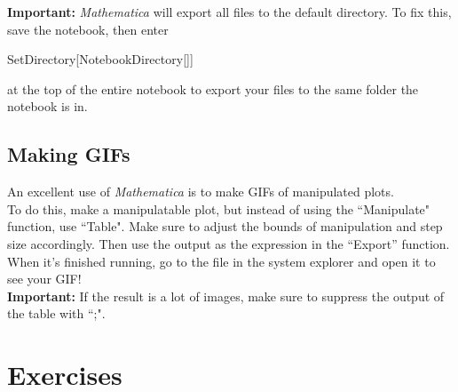 \documentclass[11pt,a4paper,twoside]{article}
\begin{document}
			\textbf{Important:}  \textit{Mathematica} will export all files to the default directory.  To fix this, save the notebook, then enter
			
			\begin{center}
			
				SetDirectory[NotebookDirectory[]]
			
			\end{center}
			
			at the top of the entire notebook to export your files to the same folder the notebook is in.
			
			\subsection{Making GIFs}
			
				An excellent use of \textit{Mathematica} is to make GIFs of manipulated plots. \\
				
				To do this, make a manipulatable plot, but instead of using the ``Manipulate" function, use ``Table".  Make sure to adjust the bounds of manipulation and step size accordingly.  Then use the output as the expression in the ``Export'' function. \\
				
				When it's finished running, go to the file in the system explorer and open it to see your GIF! \\
				
				\textbf{Important:} If the result is a lot of images, make sure to suppress the output of the table with ``;".
			
		\section{Exercises}
		
\end{document}
